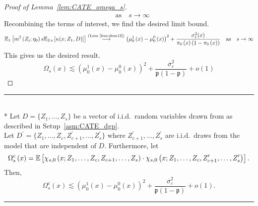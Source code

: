 \begin{proof}[Proof of Lemma~\ref{lem:CATE_omega_s}]
\begin{equation}
\begin{aligned}
			\quad \text{as} \quad s \rightarrow \infty
		\end{aligned}
	\end{equation}
	Recombining the terms of interest, we find the desired limit bound.
	\begin{equation}
		\begin{aligned}
			\mathbb{E}_{1}\left[m^2\left(Z_{i}; \eta_{0}\right) s \mathbb{E}_{2:s}\left[\kappa(x; Z_1, D)\right]\right]
			\overset{\text{(Lem~\ref{lem:dem13})}}{\longrightarrow} \left(\mu_{0}^{1}\left(x\right) - \mu_{0}^{0}\left(x\right)\right)^2 + \frac{\sigma_{\varepsilon}^2(x)}{\pi_{0}\left(x\right)\left(1 - \pi_{0}\left(x\right)\right)}
			\quad \text{as} \quad s \rightarrow \infty
		\end{aligned}
	\end{equation}
    This gives us the desired result.
    \begin{equation}
        \Omega_{s}\left(x\right)
        \lesssim \left(\mu_{0}^{1}\left(x\right) - \mu_{0}^{0}\left(x\right)\right)^2 + \frac{\overline{\sigma}^2_{\varepsilon}}{\mathfrak{p}\left(1 - \mathfrak{p}\right)} + o(1)
    \end{equation}
\end{proof}

\hrule 

\begin{lem}\label{lem:CATE_omega_sc}\mbox{}\\*
	Let $D = \{Z_1, \dotsc, Z_{s}\}$ be a vector of i.i.d.\ random variables drawn from as described in Setup~\ref{asm:CATE_dgp}.\\
	Let $D^{\prime} = \{Z_1, \dotsc, Z_{c}, Z_{c+1}^{\prime}, \dotsc,  Z_{s}^{\prime}\}$ where $Z_{c+1}^{\prime}, \dotsc,  Z_{s}^{\prime}$ are i.i.d.\ draws from the model that are independent of $D$.
	Furthermore, let
	\begin{equation}
		\Omega_{s}^{c}\left(x\right)
		= \mathbb{E}\left[\chi_{s,0}\left(x; Z_1, \ldots, Z_{c}, Z_{c+1}, \ldots, Z_{s}\right) \cdot
			\chi_{s,0}\left(x; Z_1, \ldots,Z_{c}, Z_{c+1}^{\prime}, \ldots, Z_{s}^{\prime}\right)\right].
	\end{equation}
	Then,
	\begin{equation}
		\Omega_{s}^{c}\left(x\right)
		\lesssim \left(\mu_{0}^{1}\left(x\right) - \mu_{0}^{0}\left(x\right)\right)^2
		+ \frac{\overline{\sigma}^2_{\varepsilon}}{\mathfrak{p}\left(1 - \mathfrak{p}\right)} + o(1).
	\end{equation}
\end{lem}

\hrule

